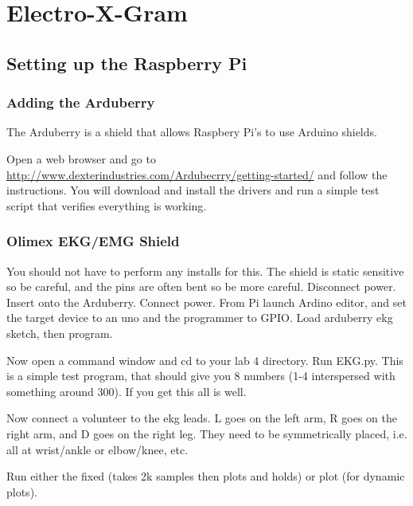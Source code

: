 \chapter{Electro-X-Gram}


\section{Setting up the Raspberry Pi}

\subsection{Adding the Arduberry}

The Arduberry is a shield that allows Raspbery Pi's to use Arduino shields.

Open a web browser and go to \url{http://www.dexterindustries.com/Ardubecrry/getting-started/} and follow the instructions.  You will download and install the drivers and run a simple test script that verifies everything is working.

\subsection{Olimex EKG/EMG Shield}

You should not have to perform any installs for this.  The shield is static sensitive so be careful, and the pins are often bent so be more careful.  Disconnect power.  Insert onto the Arduberry. Connect power.  From Pi launch Ardino editor, and set the target device to an uno and the programmer to GPIO. Load arduberry ekg sketch, then program. 

Now open a command window and cd to your lab 4 directory.  Run EKG.py.  This is a simple test program, that should give you 8 numbers (1-4 interspersed with something around 300).  If you get this all is well.

Now connect a volunteer to the ekg leads.  L goes on the left arm, R goes on the right arm, and D goes on the right leg.  They need to be symmetrically placed, i.e. all at wrist/ankle or elbow/knee, etc.

Run either the fixed (takes 2k samples then plots and holds) or plot (for dynamic plots).